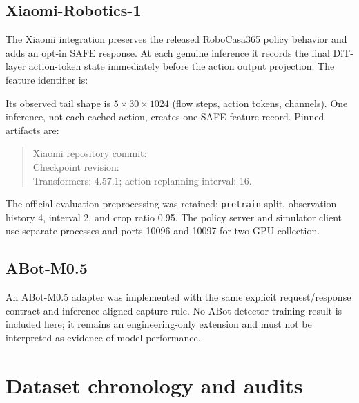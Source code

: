 \documentclass[11pt,a4paper]{article}
\newcommand{\code}[1]{\texttt{#1}}
\begin{document}
\subsection{Xiaomi-Robotics-1}
The Xiaomi integration preserves the released RoboCasa365 policy behavior and
adds an opt-in SAFE response. At each genuine inference it records the final
DiT-layer action-token state immediately before the action output projection.
The feature identifier is:
\begin{quote}\small
{}
\end{quote}
Its observed tail shape is $5\times30\times1024$ (flow steps, action tokens,
channels). One inference,
not each cached action, creates one SAFE feature record. Pinned artifacts are:
\begin{quote}\small
Xiaomi repository commit:
\\
Checkpoint revision:
\\
Transformers: 4.57.1; action replanning interval: 16.
\end{quote}
The official evaluation preprocessing was retained: \code{pretrain} split,
observation history 4, interval 2, and crop ratio 0.95. The policy server and
simulator client use separate processes and ports 10096 and 10097 for
two-GPU collection.

\subsection{ABot-M0.5}
An ABot-M0.5 adapter was implemented with the same explicit request/response contract and inference-aligned capture rule. No ABot detector-training result is included here; it remains an engineering-only extension and must not be interpreted as evidence of model performance.

\section{Dataset chronology and audits}
\end{document}
